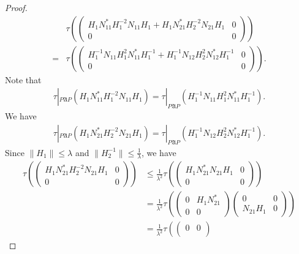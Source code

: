 \documentclass[a4paper,10pt]{amsart}
\newcommand{\AAA}{\mathfrak A}
\begin{document}
\begin{proof}
\begin{align*}
    &\tau \left ( \begin{pmatrix}
           H_{1}N_{11}^{*}H_{1}^{-2}N_{11}H_{1} + 
           H_{1}N_{21}^{*}H_{2}^{-2}N_{21}H_{1} & 0 \\
           0 & 0
       \end{pmatrix} \right )\\
       = &\tau \left (\begin{pmatrix}
       H_{1}^{-1}N_{11}H_{1}^{2}N_{11}^{*}H_{1}^{-1}
       + H_{1}^{-1}N_{12}H_{2}^{2}N_{12}^{*}H_{1}^{-1} & 0\\
       0 & 0
   \end{pmatrix} \right). 
\end{align*}
Note that 
\begin{align*}
    \tau|_{P\AAA P}(H_{1}N_{11}^{*}H_{1}^{-2}N_{11}H_{1}) 
    = \tau|_{P\AAA P}(H_{1}^{-1}N_{11}H_{1}^{2}N_{11}^{*}H_{1}^{-1}).
\end{align*}
We have
\begin{align*}
    \tau|_{P\AAA P}(H_{1}N_{21}^{*}H_{2}^{-2}N_{21}H_{1}) 
    = \tau|_{P\AAA P}(H_{1}^{-1}N_{12}H_{2}^{2}N_{12}^{*}H_{1}^{-1}). 
\end{align*}
Since $\| H_{1} \| \leq \lambda$ and $\|H_{2}^{-1}\| \leq \frac{1}{\lambda}$, 
we have
\begin{align*}
    \tau \left (
    \begin{pmatrix}
        H_{1}N_{21}^{*}H_{2}^{-2}N_{21}H_{1} & 0\\
        0 & 0
    \end{pmatrix} \right)
    &\leq  \frac{1}{\lambda^{2}}
    \tau \left (
    \begin{pmatrix}
        H_{1}N_{21}^{*}N_{21}H_{1} & 0 \\
        0 & 0
    \end{pmatrix} \right) \\
    & = \frac{1}{\lambda^{2}} \tau \left (
         \begin{pmatrix}
             0 & H_1 N_{21}^{*}\\
             0 & 0
         \end{pmatrix}
         \begin{pmatrix}
             0 & 0\\
             N_{21}H_1 & 0
         \end{pmatrix}
    \right ) \\
    & = \frac{1}{\lambda^{2}} \tau \left (
        \begin{pmatrix}
            0 & 0\\

\end{pmatrix}
\end{align*}
\end{proof}
\end{document}
